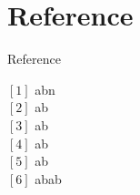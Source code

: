 \section{Reference}

\begin{frame}{Reference}
    \begin{block}{}
        $[1]$ abn\\
        \midskip
        $[2]$ ab\\
        \midskip
        $[3]$ ab\\
        \midskip
        $[4]$ ab\\
        \midskip
        $[5]$ ab\\
        \midskip
        $[6]$ abab
    \end{block}
\end{frame}